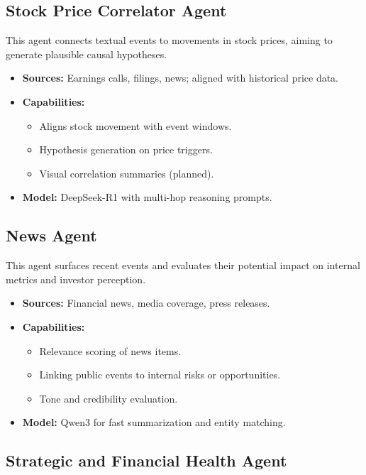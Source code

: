\documentclass[11pt]{article}
\begin{document}
\subsection*{Stock Price Correlator Agent}

This agent connects textual events to movements in stock prices, aiming to generate plausible causal hypotheses.

\begin{itemize}
    \item \textbf{Sources:} Earnings calls, filings, news; aligned with historical price data.
    \item \textbf{Capabilities:}
        \begin{itemize}
            \item Aligns stock movement with event windows.
            \item Hypothesis generation on price triggers.
            \item Visual correlation summaries (planned).
        \end{itemize}
    \item \textbf{Model:} DeepSeek-R1 with multi-hop reasoning prompts.
\end{itemize}

\subsection*{News Agent}

This agent surfaces recent events and evaluates their potential impact on internal metrics and investor perception.

\begin{itemize}
    \item \textbf{Sources:} Financial news, media coverage, press releases.
    \item \textbf{Capabilities:}
        \begin{itemize}
            \item Relevance scoring of news items.
            \item Linking public events to internal risks or opportunities.
            \item Tone and credibility evaluation.
        \end{itemize}
    \item \textbf{Model:} Qwen3 for fast summarization and entity matching.
\end{itemize}

\subsection*{Strategic and Financial Health Agent}
\end{document}
